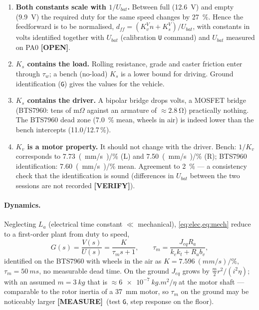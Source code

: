 \documentclass[11pt,a4paper]{article}
\newcommand{\mk}[2]{\textsf{\scriptsize\bfseries\colorbox{#1bg}{\color{#1}[#2]}}}
\newcommand{\MEASURE}{\mk{warn}{MEASURE}}
\newcommand{\VERIFY}{\mk{cold}{VERIFY}}
\newcommand{\OPEN}{\mk{grey}{OPEN}}
\newcommand{\code}[1]{\texttt{\small #1}}
\begin{document}
\begin{enumerate}[leftmargin=6mm]
\item \textbf{Both constants scale with $1/U_{bat}$.} Between full (\qty{12.6}{V})
and empty (\qty{9.9}{V}) the required duty for the same speed changes by
\qty{27}{\percent}. Hence the feedforward is to be normalised,
$d_{ff}=(K_v^{V}n+K_s^{V})/U_{bat}$, with constants in volts identified together
with $U_{bat}$ (calibration \code{U} command) and $U_{bat}$ measured on PA0
\OPEN.
\item \textbf{$K_s$ contains the load.} Rolling resistance, grade and caster
friction enter through $\tau_w$; a bench (no-load) $K_s$ is a lower bound for
driving. Ground identification (\code{G}) gives the values for the vehicle.
\item \textbf{$K_s$ contains the driver.} A bipolar bridge drops volts, a MOSFET
bridge (BTS7960: tens of m$\Omega$ against an armature of $\approx\qty{2.8}{\ohm}$)
practically nothing. The BTS7960 dead zone (\qty{7.0}{\percent} mean, wheels in air)
is indeed lower than the bench intercepts (11.0/12.7\,\%).
\item \textbf{$K_v$ is a motor property.} It should not change with the driver.
Bench: $1/K_v$ corresponds to \qty{7.73}{(mm/s)/\percent} (L) and \qty{7.50}{(mm/s)/\percent}
(R); BTS7960 identification: \qty{7.60}{(mm/s)/\percent} mean. Agreement to
\qty{2}{\percent} --- a consistency check that the identification is sound
(differences in $U_{bat}$ between the two sessions are not recorded \VERIFY).
\end{enumerate}

\paragraph{Dynamics.} Neglecting $L_a$ (electrical time constant $\ll$ mechanical),
\cref{eq:elec,eq:mech} reduce to a first-order plant from duty to speed,
\begin{equation}
G(s)=\frac{V(s)}{U(s)}=\frac{K}{\tau_m s+1},\qquad
\tau_m=\frac{J_{eq}R_a}{k_e k_t+R_a b_v},\label{eq:plant}
\end{equation}
identified on the BTS7960 with wheels in the air as $K=\qty{7.596}{(mm/s)/\percent}$,
$\tau_m=\qty{50}{ms}$, no measurable dead time. On the ground $J_{eq}$ grows by
$\tfrac m2r^2/(i^2\eta)$; with an assumed $m=\qty{3}{kg}$ that is
$\approx\qty{6e-7}{kg.m^2}/\eta$ at the motor shaft --- comparable to the rotor
inertia of a \qty{37}{mm} motor, so $\tau_m$ on the ground may be noticeably
larger \MEASURE\ (test \code{G}, step response on the floor).
\end{document}
